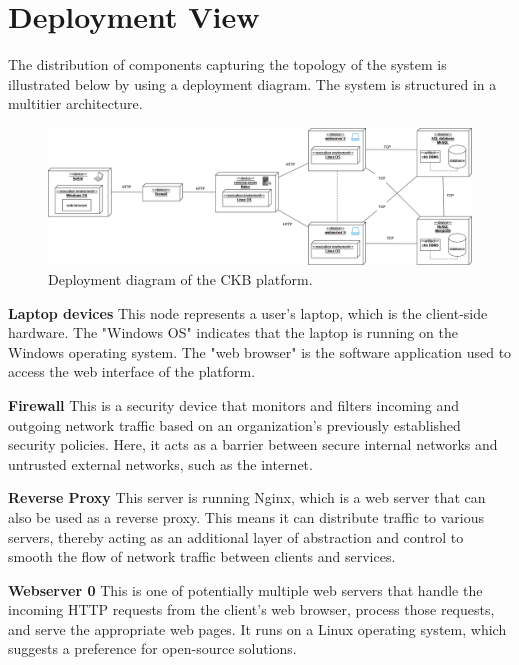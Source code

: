 \section{Deployment View}
\label{sec: deployment_view}%
The distribution of components capturing the topology of the system is illustrated below by using a deployment diagram.
The system is structured in a multitier architecture.
\newline
\begin{figure} [H]
    \begin{center}
        \includegraphics[width=1\linewidth]{Images/deployment_diag.png}
        \caption{Deployment diagram of the CKB platform.}
        \label{fig: depl_diagram}
    \end{center}
\end{figure}


\noindent\textbf{Laptop devices}\newline
This node represents a user's laptop, which is the client-side hardware. The "Windows OS" indicates that the laptop is running on the Windows operating system. 
The "web browser" is the software application used to access the web interface of the platform.

\noindent\textbf{Firewall}\newline
This is a security device that monitors and filters incoming and outgoing network traffic based on an organization's previously established security policies. 
Here, it acts as a barrier between secure internal networks and untrusted external networks, such as the internet.

\noindent\textbf{Reverse Proxy}\newline
This server is running Nginx, which is a web server that can also be used as a reverse proxy. This means it can distribute traffic to various servers, 
thereby acting as an additional layer of abstraction and control to smooth the flow of network traffic between clients and services.

\noindent\textbf{Webserver 0}\newline
This is one of potentially multiple web servers that handle the incoming HTTP requests from the client's web browser, process those requests, 
and serve the appropriate web pages. It runs on a Linux operating system, which suggests a preference for open-source solutions.

